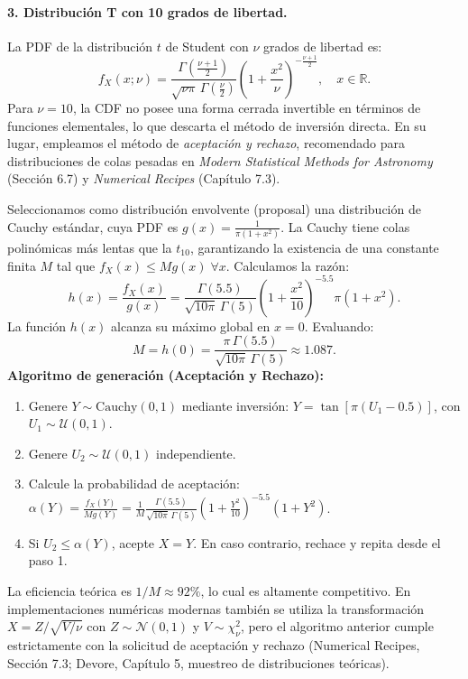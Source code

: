\documentclass[12pt]{article}
\begin{document}
\paragraph{3. Distribución T con 10 grados de libertad.}
La PDF de la distribución $t$ de Student con $\nu$ grados de libertad es:
$$
f_X(x; \nu) = \frac{\Gamma\left(\frac{\nu+1}{2}\right)}{\sqrt{\nu\pi}\,\Gamma\left(\frac{\nu}{2}\right)} \left( 1 + \frac{x^2}{\nu} \right)^{-\frac{\nu+1}{2}}, \quad x \in \mathbb{R}.
$$
Para $\nu = 10$, la CDF no posee una forma cerrada invertible en términos de funciones elementales, lo que descarta el método de inversión directa. En su lugar, empleamos el método de \textit{aceptación y rechazo}, recomendado para distribuciones de colas pesadas en \textit{Modern Statistical Methods for Astronomy} (Sección 6.7) y \textit{Numerical Recipes} (Capítulo 7.3).

Seleccionamos como distribución envolvente (proposal) una distribución de Cauchy estándar, cuya PDF es $g(x) = \frac{1}{\pi(1+x^2)}$. La Cauchy tiene colas polinómicas más lentas que la $t_{10}$, garantizando la existencia de una constante finita $M$ tal que $f_X(x) \leq M g(x) \; \forall x$. Calculamos la razón:
$$
h(x) = \frac{f_X(x)}{g(x)} = \frac{\Gamma(5.5)}{\sqrt{10\pi}\,\Gamma(5)} \left( 1 + \frac{x^2}{10} \right)^{-5.5} \pi (1+x^2).
$$
La función $h(x)$ alcanza su máximo global en $x=0$. Evaluando:
$$
M = h(0) = \frac{\pi \, \Gamma(5.5)}{\sqrt{10\pi} \, \Gamma(5)} \approx 1.087.
$$
\textbf{Algoritmo de generación (Aceptación y Rechazo):}
\begin{enumerate}
    \item Genere $Y \sim \text{Cauchy}(0,1)$ mediante inversión: $Y = \tan\left[\pi(U_1 - 0.5)\right]$, con $U_1 \sim \mathcal{U}(0,1)$.
    \item Genere $U_2 \sim \mathcal{U}(0,1)$ independiente.
    \item Calcule la probabilidad de aceptación: $\alpha(Y) = \frac{f_X(Y)}{M g(Y)} = \frac{1}{M} \frac{\Gamma(5.5)}{\sqrt{10\pi}\,\Gamma(5)} \left( 1 + \frac{Y^2}{10} \right)^{-5.5} (1+Y^2)$.
    \item Si $U_2 \leq \alpha(Y)$, acepte $X = Y$. En caso contrario, rechace y repita desde el paso 1.
\end{enumerate}
La eficiencia teórica es $1/M \approx 92\%$, lo cual es altamente competitivo. En implementaciones numéricas modernas también se utiliza la transformación $X = Z/\sqrt{V/\nu}$ con $Z \sim \mathcal{N}(0,1)$ y $V \sim \chi^2_\nu$, pero el algoritmo anterior cumple estrictamente con la solicitud de aceptación y rechazo (Numerical Recipes, Sección 7.3; Devore, Capítulo 5, muestreo de distribuciones teóricas).
\end{document}
